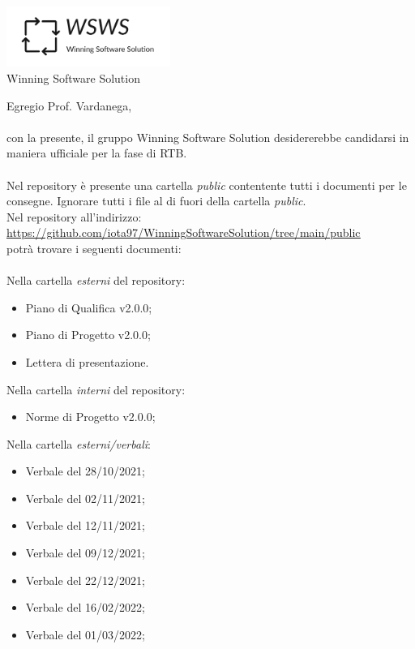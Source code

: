 \documentclass[a4paper, 12pt]{letter}
\begin{document}
\begin{center}
\includegraphics[width=0.4\textwidth]{WSWS-logos_transparent_crop}\\
{\Large Winning Software Solution}\\[24pt]
\end{center}
Egregio Prof. Vardanega,\\\\
con la presente, il gruppo Winning Software Solution desidererebbe candidarsi in maniera ufficiale
per la fase di RTB.\\\\
Nel repository è presente una cartella \textit{public} contentente tutti i documenti per le consegne. Ignorare tutti i file
al di fuori della cartella \textit{public}.\\
Nel repository all'indirizzo: \\
\href{https://github.com/iota97/WinningSoftwareSolution/tree/main/public}{\underline{https://github.com/iota97/WinningSoftwareSolution/tree/main/public}}\\ 
potrà trovare i seguenti documenti:\\\\

Nella cartella \textit{esterni} del repository:
\begin{itemize}
\item Piano di Qualifica v2.0.0;
\item Piano di Progetto v2.0.0;
\item Lettera di presentazione.
\end{itemize}
Nella cartella \textit{interni} del repository:
\begin{itemize}
    \item Norme di Progetto v2.0.0;
\end{itemize}
Nella cartella \textit{esterni/verbali}:
\begin{itemize}
    \item Verbale del 28/10/2021; 
    \item Verbale del 02/11/2021; 
    \item Verbale del 12/11/2021; 
    \item Verbale del 09/12/2021; 
    \item Verbale del 22/12/2021; 
    \item Verbale del 16/02/2022; 
    \item Verbale del 01/03/2022; 
\end{itemize}
\end{document}
